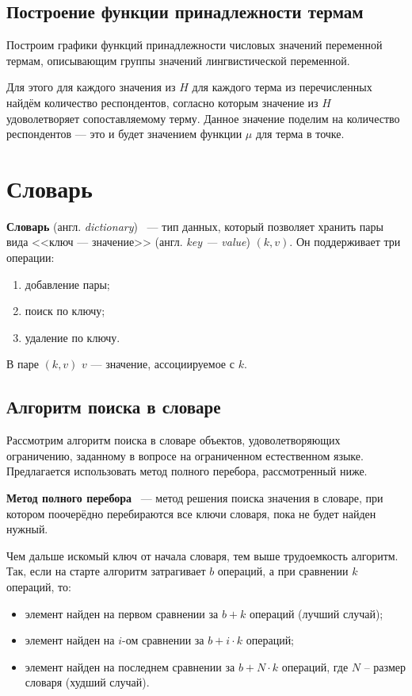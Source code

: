 \subsection{Построение функции принадлежности термам}

Построим графики функций принадлежности числовых значений переменной термам, описывающим группы значений лингвистической переменной.

Для этого для каждого значения из $H$ для каждого терма из перечисленных найдём количество респондентов, согласно которым значение из $H$ удоволетворяет сопоставляемому терму.
Данное значение поделим на количество респондентов --- это и будет значением функции $\mu$ для терма в точке.
	





\section{Словарь}

\textbf{Словарь} (англ. \textit{dictionary})~\cite{dict} --- тип данных, который позволяет хранить пары вида <<ключ  --- значение>> (англ. \textit{key --- value}) $(k, v)$. Он поддерживает три операции:
\begin{enumerate}[label=\arabic*)]
	\item добавление пары;
	\item поиск по ключу;
	\item удаление по ключу.
\end{enumerate}
В паре $(k, v)$ $v$ --- значение, ассоциируемое с $k$.

\subsection{Алгоритм поиска в словаре}

Рассмотрим алгоритм поиска в словаре объектов, удоволетворяющих ограничению, заданному в вопросе на ограниченном естественном языке.
Предлагается использовать метод полного перебора, рассмотренный ниже.

\textbf{Метод полного перебора}~\cite{full-comb} --- метод решения поиска значения в словаре, при котором поочерёдно перебираются все ключи словаря, пока не будет найден нужный.

Чем дальше искомый ключ от начала словаря, тем выше трудоемкость алгоритм. Так, если на старте алгоритм затрагивает $b$ операций, а при сравнении $k$ операций, то:
\begin{itemize}[label=---]
	\item элемент найден на первом сравнении за $b + k$ операций (лучший случай);
	\item элемент найден на $i$-ом сравнении за $b + i \cdot k$ операций;
	\item элемент найден на последнем сравнении за $b +  N \cdot k$ операций, где $N$ -- размер словаря (худший случай).
\end{itemize}

